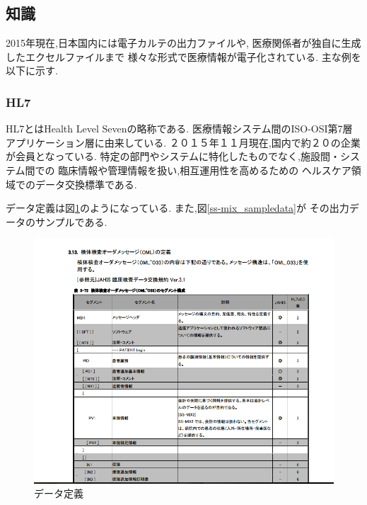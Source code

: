 \subsection{知識}
  2015年現在,日本国内には電子カルテの出力ファイルや,
  医療関係者が独自に生成したエクセルファイルまで
  様々な形式で医療情報が電子化されている.
  主な例を以下に示す.

  \subsubsection{HL7}
  HL7とはHealth Level Sevenの略称である.
  医療情報システム間のISO-OSI第7層アプリケーション層に由来している.
  ２０１５年１１月現在,国内で約２０の企業が会員となっている.
  特定の部門やシステムに特化したものでなく,施設間・システム間での
  臨床情報や管理情報を扱い,相互運用性を高めるための
  ヘルスケア領域でのデータ交換標準である.\cite{bibi5} \cite{bibi6}

  データ定義は図\ref{ss-mix_sample}のようになっている.
  また,図\ref{ss-mix_sampledata}が
  その出力データのサンプルである.

	\begin{figure}[htbp]
    \begin{center}
			\includegraphics[width=12cm, bb=0 0 792 630]{./gazou/ss-mix_sample.png} %
    \end{center}
    \caption{データ定義}
		\label{ss-mix_sample}
	\end{figure}

